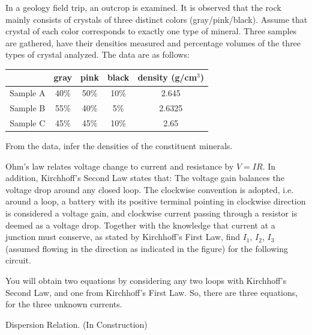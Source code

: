 \begin{Exercise}
In a geology field trip, an outcrop is examined. It is observed that the rock mainly consists of crystals of three distinct colors (gray/pink/black). Assume that crystal of each color corresponds to exactly one type of mineral. Three samples are gathered, have their densities measured and percentage volumes of the three types of crystal analyzed. The data are as follows:
\begin{center}
\begin{tabular}{|c|c|c|c|c|}
\hline
 & gray & pink & black & density (g/cm$^3$) \\
\hline
Sample A & 40\% & 50\% & 10\% & 2.645\\
\hline
Sample B & 55\% & 40\% & 5\% & 2.6325\\
\hline
Sample C & 45\% & 45\% & 10\% & 2.65\\
\hline
\end{tabular}
\end{center}
From the data, infer the densities of the constituent minerals.
\end{Exercise}

\begin{Exercise}
Ohm's law relates voltage change to current and resistance by $V=IR$. In addition, Kirchhoff’s Second Law states that: The voltage gain balances the voltage drop around any closed loop. The clockwise convention is adopted, i.e. around a loop, a battery with its positive terminal pointing in clockwise direction is considered a voltage gain, and clockwise current passing through a resistor is deemed as a voltage drop. Together with the knowledge that current at a junction must conserve, as stated by Kirchhoff's First Law, find $I_1$, $I_2$, $I_3$ (assumed flowing in the direction as indicated in the figure) for the following circuit.
\begin{center}
\end{center}
\end{Exercise}
You will obtain two equations by considering any two loops with Kirchhoff’s Second Law, and one from Kirchhoff's First Law. So, there are three equations, for the three unknown currents.

\begin{Exercise}
Dispersion Relation. (In Construction)
\end{Exercise}
